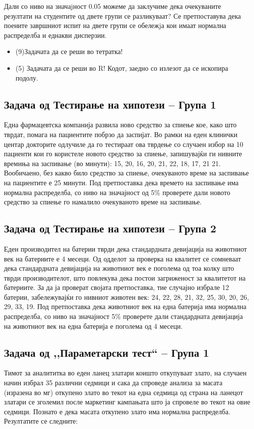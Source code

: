 \documentclass[a4paper, 12pt]{article}
\begin{document}
Дали со ниво на значаjност 0.05 можеме да заклучиме дека очекуваните резултати на студентите од двете групи се разликуваат? Се претпоставува дека поените завршниот испит на двете групи се обележjа кои имаат нормална распределба и еднакви дисперзии.

\begin{itemize}
  \item [а)] (9)Задачата да се реши во тетратка!
  \item [б)] (5) Задачата да се реши во R! Кодот, заедно со излезот да се ископира подолу.
\end{itemize}


\subsection*{Задача од Тестирање на хипотези – Група 1}
Една фармацевтска компанија развила ново средство за спиење кое, како што тврдат, помага на пациентите побрзо да заспијат. Во рамки на еден клинички центар докторите одлучиле да го тестираат ова тврдење со случаен избор на 10 пациенти кои го користеле новото средство за спиење, запишувајќи ги нивните времиња на заспивање (во минути): 15, 20, 16, 20, 21, 22, 18, 17, 21 21. Вообичаено, без какво било средство за спиење, очекуваното време на заспивање на пациентите е 25 минути. Под претпоставка дека времето на заспивање има нормална распределба, со ниво на значајност од 5\% проверете дали новото средство за спиење го намалило очекуваното време на заспивање.

\subsection*{Задача од Тестирање на хипотези – Група 2}
Еден производител на батерии тврди дека стандардната девијација на животниот век на батериите е 4 месеци. Од одделот за проверка на квалитет се сомневаат дека стандардната девијација на животниот век е поголема од тоа колку што тврди производителот, што повлекува дека постои загриженост за квалитетот на батериите. За да ја проверат својата претпоставка, тие случајно избрале 12 батерии, забележувајќи го нивниот животен век: 24, 22, 28, 21, 32, 25, 30, 20, 26, 29, 33, 19. Под претпоставка дека животниот век на една батерија има нормална распределба, со ниво на значајност 5\% проверете дали стандардната девијација на животниот век на една батерија е поголема од 4 месеци.


\subsection*{Задача од ,,Параметарски тест`` – Група 1}
Тимот за аналититка во еден ланец златари коишто откупуваат злато, на случаен начин избрал 35 различни седмици и сака да спроведе анализа за масата (изразена во мг) откупено злато во текот на една седмица од страна на ланецот златари се зголемил после маркетинг кампањата што ја спровеле во текот на овие седмици. Познато е дека масата откупено злато има нормална распределба. Резултатите се следните: \\
\end{document}
